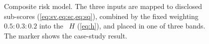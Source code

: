 \begin{figure}[!tp]
\begin{tikzpicture}
  \end{tikzpicture}
  \caption{Composite risk model. The three inputs are mapped to disclosed
           sub-scores (\cref{eq:sv,eq:sc,eq:sq}), combined by the fixed
           weighting $0.5{:}0.3{:}0.2$ into the \phindex\ $H$
           (\cref{eq:h}), and placed in one of three bands. The marker
           shows the case-study result.}
  \label{fig:riskmodel}
\end{figure}
